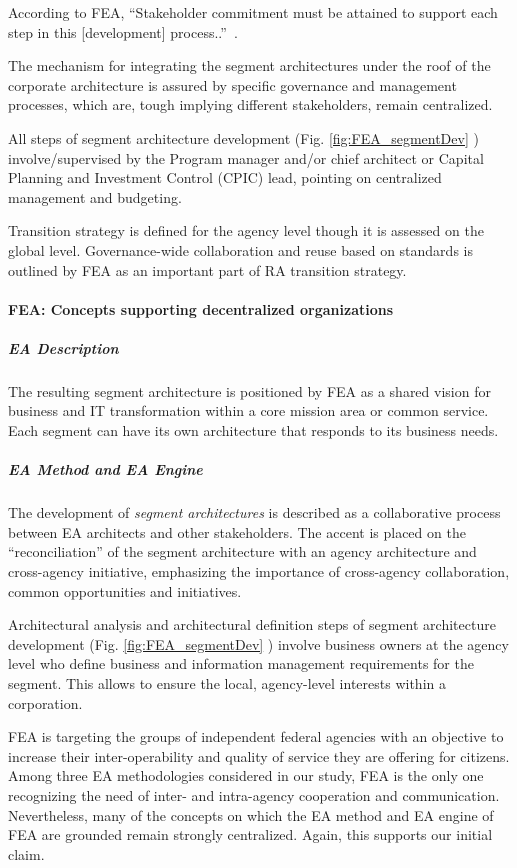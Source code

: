 According to FEA, ``Stakeholder commitment must be attained to support each step in this [development] process..''~\cite{FEA_PMO2007}.
 
The mechanism for integrating the segment architectures under the roof of the corporate architecture is  assured by specific governance and management processes, which are, tough implying different stakeholders, remain centralized. 

All steps of segment architecture development (Fig. \ref{fig:FEA_segmentDev} ) involve/supervised by the Program manager and/or chief architect or Capital Planning and Investment Control (CPIC) lead, pointing on centralized management and budgeting.

Transition strategy is defined for the agency level though it is assessed on the global level. Governance-wide collaboration and reuse based on standards is outlined by FEA as an important part of RA transition strategy.

\paragraph*{FEA: Concepts supporting decentralized organizations}
\subparagraph*{EA Description}

The resulting segment architecture is positioned by FEA as a shared vision for business and IT transformation within a core mission area or common service. Each segment can have its own architecture that responds to its business needs.

\subparagraph*{EA Method and EA Engine}

The development of \textit{segment architectures} is described as a collaborative process between EA architects and other stakeholders. The accent is placed on the ``reconciliation'' of the segment architecture with an agency architecture and cross-agency initiative, emphasizing the importance of  cross-agency collaboration, common opportunities and initiatives.

Architectural analysis and architectural definition steps of segment architecture development (Fig. \ref{fig:FEA_segmentDev} ) involve business owners at the agency level who define business and information management requirements for the segment. This allows to ensure the local, agency-level interests within a corporation. 

FEA is targeting the groups of independent federal agencies with an objective to increase their inter-operability and quality of service they are offering for citizens. Among three EA methodologies considered in our study, FEA is the only one recognizing the need of inter- and intra-agency cooperation and communication. Nevertheless, many of the concepts on which the EA method and EA engine of FEA are grounded remain strongly centralized. Again, this supports our initial claim.

